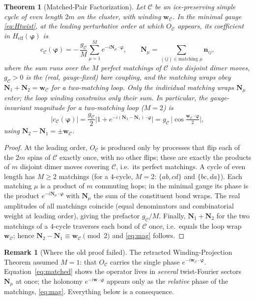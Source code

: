 \documentclass[11pt,letterpaper]{article}
\newcommand{\bvarphi}{\bm{\varphi}}
\newcommand{\bw}{\mathbf{w}}
\newcommand{\bn}{\mathbf{n}}
\newcommand{\bN}{\mathbf{N}}
\newcommand{\Heff}{H_{\mathrm{eff}}}
\theoremstyle{plain}
\newtheorem{theorem}{Theorem}
\theoremstyle{definition}
\newtheorem{remark}{Remark}
\begin{document}
\begin{theorem}[Matched-Pair Factorization]
\label{thm:matched}
Let $\mathcal C$ be an ice-preserving simple cycle of even length
$2m$ on the cluster, with winding $\bw_{\mathcal C}$. In the minimal
gauge \eqref{eq:Htwist}, at the leading perturbative order at which
$O_{\mathcal C}$ appears, its coefficient in $\Heff(\bvarphi)$ is
\begin{equation}
c_{\mathcal C}(\bvarphi)
= -\,\frac{g_{\mathcal C}}{M}\sum_{\mu=1}^{M}
e^{-i\bN_\mu\cdot\bvarphi},
\qquad
\bN_\mu=\!\!\sum_{(ij)\in\text{matching }\mu}\!\!\bn_{ij},
\label{eq:matched}
\end{equation}
where the sum runs over the $M$ perfect matchings of $\mathcal C$ into
disjoint dimer moves, $g_{\mathcal C}>0$ is the (real, gauge-fixed)
bare coupling, and the matching wraps obey $\bN_1+\bN_2=\bw_{\mathcal C}$
for a two-matching loop. Only the individual matching wraps $\bN_\mu$
enter; the loop winding constrains only their sum. In
particular, the gauge-invariant magnitude for a two-matching loop
($M=2$) is
\begin{equation}
|c_{\mathcal C}(\bvarphi)|
=\frac{g_{\mathcal C}}{2}\bigl|1+e^{-i(\bN_2-\bN_1)\cdot\bvarphi}\bigr|
=g_{\mathcal C}\,\bigl|\cos\tfrac{\bw_{\mathcal C}\cdot\bvarphi}{2}\bigr|,
\label{eq:mag}
\end{equation}
using $\bN_2-\bN_1=\pm\bw_{\mathcal C}$.
\end{theorem}

\begin{proof}
At the leading order, $O_{\mathcal C}$ is produced only by processes
that flip each of the $2m$ spins of $\mathcal C$ exactly once, with no
other flips; these are exactly the products of $m$ disjoint dimer moves
covering $\mathcal C$, i.e.\ its perfect matchings. A cycle of even
length has $M\ge2$ matchings (for a $4$-cycle, $M=2$: $\{ab,cd\}$ and
$\{bc,da\}$). Each matching $\mu$ is a product of $m$ commuting hops; in
the minimal gauge its phase is the product $e^{-i\bN_\mu\cdot\bvarphi}$
with $\bN_\mu$ the sum of the constituent bond wraps. The real amplitudes
of all matchings coincide (equal denominators and combinatorial weight
at leading order), giving the prefactor $g_{\mathcal C}/M$. Finally,
$\bN_1+\bN_2$ for the two matchings of a $4$-cycle traverses each bond of
$\mathcal C$ once, i.e.\ equals the loop wrap $\bw_{\mathcal C}$; hence
$\bN_2-\bN_1\equiv\bw_{\mathcal C}\pmod2$ and \eqref{eq:mag} follows.
\end{proof}

\begin{remark}[Where the old proof failed]
The retracted Winding-Projection Theorem assumed $M=1$: that
$O_{\mathcal C}$ carries the single phase $e^{-i\bw_{\mathcal
C}\cdot\bvarphi}$. Equation~\eqref{eq:matched} shows the operator lives
in \emph{several} twist-Fourier sectors $\bN_\mu$ at once; the holonomy
$e^{-i\bw\cdot\bvarphi}$ appears only as the \emph{relative} phase of the
matchings, \eqref{eq:mag}. Everything below is a consequence.
\end{remark}
\end{document}
